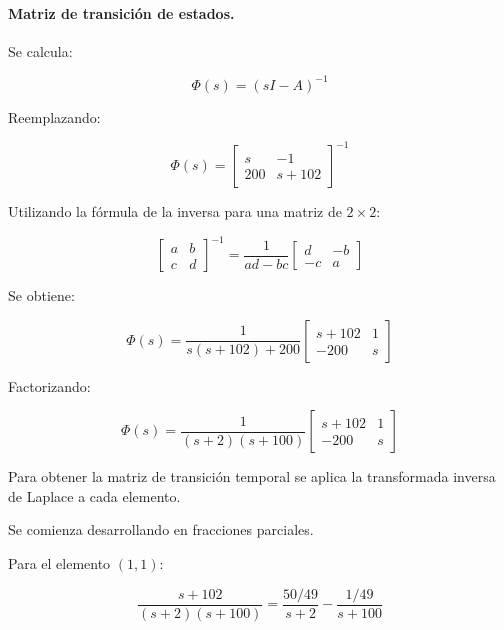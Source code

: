 \documentclass[12pt,a4paper]{article}
\begin{document}
\paragraph{Matriz de transición de estados.} Se calcula:

\begin{equation}\Phi(s)=(sI-A)^{-1}\end{equation}

Reemplazando:

\begin{equation}\Phi(s)=\begin{bmatrix}s&-1\\200&s+102\end{bmatrix}^{-1}\end{equation}

Utilizando la fórmula de la inversa para una matriz de $2\times2$:

\begin{equation}\begin{bmatrix}a&b\\c&d\end{bmatrix}^{-1}=\frac{1}{ad-bc} \begin{bmatrix}d&-b\\-c&a\end{bmatrix}\end{equation}

Se obtiene:

\begin{equation}\Phi(s)=\frac{1}{s(s+102)+200} \begin{bmatrix}s+102&1\\-200&s\end{bmatrix}\end{equation}

Factorizando:

\begin{equation}\boxed{\Phi(s)=\frac{1}{(s+2)(s+100)} \begin{bmatrix}s+102&1\\-200&s\end{bmatrix}}\end{equation}

Para obtener la matriz de transición temporal se aplica la transformada inversa de Laplace a cada elemento.

Se comienza desarrollando en fracciones parciales.

Para el elemento $(1,1)$:

\begin{equation}\frac{s+102}{(s+2)(s+100)}=\frac{50/49}{s+2}-\frac{1/49}{s+100}\end{equation}
\end{document}
